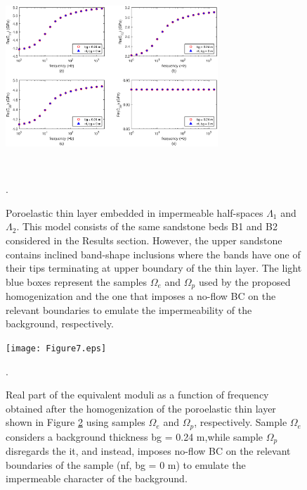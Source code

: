 \documentclass[draft]{agujournal2019}
\begin{document}
\begin{figure}[!ht]
\centering
        \includegraphics[width= 80mm, height=70mm]{Figure6.eps}
\caption{Poroelastic thin layer embedded in impermeable half-spaces $\Lambda_1$ and $\Lambda_2$. This model consists of the same sandstone beds B1 and B2 considered in the Results section. However, the upper sandstone contains inclined band-shape inclusions where the bands have one of their tips terminating at upper boundary of the thin layer. The light blue boxes represent the samples $\Omega_e$ and $\Omega_p$ used by the proposed homogenization and the one that imposes a no-flow BC on the relevant boundaries to emulate the impermeability of the background, respectively.}. 
\label{fig.6}
\end{figure}

\begin{figure}[!ht]
\centering
        \texttt{[image: Figure7.eps]}
\caption{Real part of the equivalent moduli as a function of frequency obtained after the homogenization of the poroelastic thin layer shown in Figure \ref{fig.7} using samples $\Omega_e$ and  $\Omega_p$, respectively. Sample $\Omega_e$ considers a background thickness bg = 0.24 m,while sample $\Omega_p$ disregards the it, and instead, imposes no-flow BC on the relevant boundaries of the sample (nf, bg = 0 m) to emulate the impermeable character of the background.}. 
\label{fig.7}
\end{figure}
\end{document}
